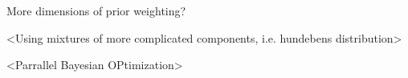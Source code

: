 More dimensions of prior weighting?

<Using mixtures of more complicated components, i.e. hundebens distribution>
 
<Parrallel Bayesian OPtimization>

